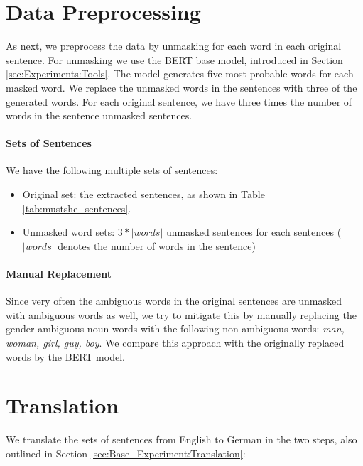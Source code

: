 \section{Data Preprocessing}
\label{sec:Real_Experiment:Preprocessing}

As next, we preprocess the data by unmasking for each word in each original sentence. For unmasking we use the BERT base model, introduced in Section \ref{sec:Experiments:Tools}. The model generates five most probable words for each masked word. We replace the unmasked words in the sentences with three of the generated words. For each original sentence, we have three times the number of words in the sentence unmasked sentences.

\paragraph{Sets of Sentences} We have the following multiple sets of sentences:
\begin{itemize}
    \item Original set: the extracted sentences, as shown in Table \ref{tab:mustshe_sentences}. 
    \item Unmasked word sets: $3*|words|$ unmasked sentences for each sentences ($|words|$ denotes the number of words in the sentence)
\end{itemize}

\paragraph{Manual Replacement} Since very often the ambiguous words in the original sentences are unmasked with ambiguous words as well, we try to mitigate this by manually replacing the gender ambiguous noun words with the following non-ambiguous words: \textit{man, woman, girl, guy, boy}. We compare this approach with the originally replaced words by the BERT model.


\section{Translation}
\label{sec:Real_Experiment:Translation}

We translate the sets of sentences from English to German in the two steps, also outlined in Section \ref{sec:Base_Experiment:Translation}:

